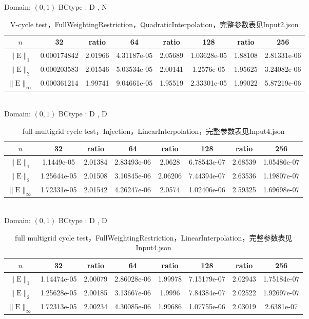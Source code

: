 \documentclass[a4paper,twoside]{ctexart}
\begin{document}
\noindent Domain: $(0,1)$
BCtype : D , N
\begin{table}[htbp]
\centering\begin{tabular}{c|ccccccc}
\hline
$n$&32&ratio&64&ratio&128&ratio&256\\
\hline
$\|\mathrm{E}\|_1$&0.000174842&2.01966&4.31187e-05&2.05689&1.03628e-05&1.88108&2.81331e-06\\
\hline
$\|\mathrm{E}\|_2$&0.000203583&2.01546&5.03534e-05&2.00141&1.2576e-05&1.95625&3.24082e-06\\
\hline
$\|\mathrm{E}\|_{\infty}$&0.000361214&1.99741&9.04661e-05&1.95519&2.33301e-05&1.99022&5.87219e-06\\
\hline
\end{tabular}
\caption{V-cycle test，FullWeightingRestriction，QuadraticInterpolation，完整参数表见Input2.json}
\end{table}\\

\noindent Domain: $(0,1)$
BCtype : D , D
\begin{table}[htbp]
\centering\begin{tabular}{c|ccccccc}
\hline
$n$&32&ratio&64&ratio&128&ratio&256\\
\hline
$\|\mathrm{E}\|_1$&1.1449e-05&2.01384&2.83493e-06&2.0628&6.78543e-07&2.68539&1.05486e-07\\
\hline
$\|\mathrm{E}\|_2$&1.25644e-05&2.01508&3.10845e-06&2.06206&7.44394e-07&2.63536&1.19807e-07\\
\hline
$\|\mathrm{E}\|_{\infty}$&1.72331e-05&2.01542&4.26247e-06&2.0574&1.02406e-06&2.59325&1.69698e-07\\
\hline
\end{tabular}
\caption{full multigrid cycle test，Injection，LinearInterpolation，完整参数表见Input4.json}
\end{table}\\

\noindent Domain: $(0,1)$
BCtype : D , D
\begin{table}[htbp]
\centering\begin{tabular}{c|ccccccc}
\hline
$n$&32&ratio&64&ratio&128&ratio&256\\
\hline
$\|\mathrm{E}\|_1$&1.14474e-05&2.00079&2.86028e-06&1.99978&7.15179e-07&2.02943&1.75184e-07\\
\hline
$\|\mathrm{E}\|_2$&1.25628e-05&2.00185&3.13667e-06&1.9996&7.84384e-07&2.02522&1.92697e-07\\
\hline
$\|\mathrm{E}\|_{\infty}$&1.72313e-05&2.00234&4.30085e-06&1.99686&1.07755e-06&2.03019&2.6381e-07\\
\hline
\end{tabular}
\caption{full multigrid cycle test，FullWeightingRestriction，LinearInterpolation，完整参数表见Input4.json}
\end{table}\\
\end{document}
